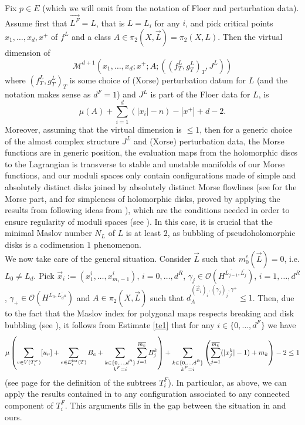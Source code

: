 	Fix $p\in E$ (which we will omit from the notation of Floer and perturbation data). Assume first that $\vec{L^F}=L$, that is $L=L_i$ for any $i$, and pick critical points $x_1,\ldots, x_d, x^+$ of $f^L$ and a class $A\in \pi_2(X,\vec{L})=\pi_2(X,L)$. Then the virtual dimension of $$\mathcal{M}^{d+1}(x_1,\ldots, x_d;x^+;A;((f^L_T,g^L_T)_T,J^L))$$ where $(f^L_T,g^L_T)_T$ is some choice of (Xorse) perturbation datum for $L$ (and the notation makes sense as $d^F=1$) and $J^L$ is part of the Floer data for $L$, is $$\mu(A)+\sum_{i=1}^d(|x_i|-n)-|x^+|+d-2.$$ Moreover, assuming that the virtual dimension is $\leq 1$, then for a generic choice of the almost complex structure $J^L$ and (Xorse) perturbation data, the Morse functions are in generic position, the evaluation maps from the holomorphic discs to the Lagrangian is transverse to stable and unstable manifolds of our Morse functions, and our moduli spaces only contain configurations made of simple and absolutely distinct disks joined by absolutely distinct Morse flowlines (see \cite{Mescher2018PerturbedCohomology} for the Morse part, and \cite{Charest2012SourceComplexes} for simpleness of holomorphic disks, proved by applying the results from \cite{Lazzarini2011RelativeCurves} following ideas from \cite{Bi-Co:Yasha-fest}), which are the conditions needed in order to ensure regularity of moduli spaces (see \cite{McD-Sa:jhol}). In this case, it is crucial that the minimal Maslov number $N_L$ of $L$ is at least $2$, as bubbling of pseudoholomorphic disks is a codimension $1$ phenomenon.\\
	We now take care of the general situation. Consider $\vec{L}$ such that $m_0^e(\vec{L})=0$, i.e. $L_0\neq L_d$. Pick $\vec{x}_i:=(x^i_1,\ldots,x^i_{m_i-1})$, $i=0,\ldots,d^R$, $\gamma_j\in \mathcal{O}\left(H^{\overline{L_{j-1}},\overline{L_j}}\right)$, $i=1,\ldots,d^R$, $\gamma_+\in \mathcal{O}\left(H^{\overline{L_0},\overline{L_{d^R}}}\right)$ and $A\in \pi_2(X,\vec{L})$ such that $d_{A}^{(\vec{x}_i)_i, (\gamma_j)_j,\gamma^+}\leq 1$. Then, due to the fact that the Maslov index for polygonal maps respects breaking and disk bubbling (see \cite{Oh2015SymplecticHomology}), it follows from Estimate \ref{te1} that for any $i\in \{0,\ldots, d^F\}$ we have $$\mu\left(\sum_{v\in V(T_i^F)}[u_v]+ \sum_{e\in E_i^\textnormal{int}(T)} B_e + \sum_{\substack{k\in \{0,\ldots, d^R\} \\ k^F=i}}\sum_{j=1}^{\overline{m_{k}}}B_j^{k}\right) + \sum_{\substack{k\in \{0,\ldots, d^R\} \\ k^F=i}}\left(\sum_{j=1}^{\overline{m_k}}(|x_j^k|-1) + m_k\right)-2 \leq 1$$ (see page \pageref{fundamentaldecomposition} for the definition of the subtrees $T^F_i$).
	In particular, as above, we can apply the results contained in \cite{Mescher2018PerturbedCohomology, Charest2012SourceComplexes} to any configuration associated to any connected component of $T_i^F$. This arguments fills in the gap between the situation in \cite{Sheridan2011OnPants} and ours.
	
